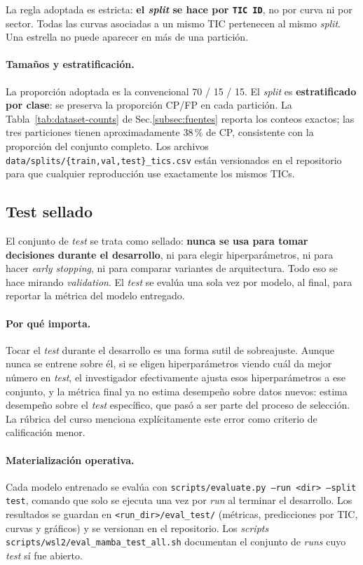 \documentclass[11pt,a4paper]{article}
\begin{document}
La regla adoptada es estricta: \textbf{el \textit{split} se hace por
\texttt{TIC ID}}, no por curva ni por sector. Todas las curvas
asociadas a un mismo TIC pertenecen al mismo \textit{split}. Una
estrella no puede aparecer en más de una partición.

\paragraph{Tamaños y estratificación.}
La proporción adoptada es la convencional 70 / 15 / 15. El \textit{split}
es \textbf{estratificado por clase}: se preserva la proporción CP/FP en
cada partición. La Tabla~\ref{tab:dataset-counts} de
Sec.\ref{subsec:fuentes} reporta los conteos exactos; las tres
particiones tienen aproximadamente 38\,\% de CP, consistente con la
proporción del conjunto completo. Los archivos
\texttt{data/splits/\{train,val,test\}\_tics.csv} están versionados en
el repositorio para que cualquier reproducción use exactamente los
mismos TICs.

\subsection{Test sellado}
\label{subsec:test-sellado}

El conjunto de \textit{test} se trata como sellado: \textbf{nunca se
usa para tomar decisiones durante el desarrollo}, ni para elegir
hiperparámetros, ni para hacer \textit{early stopping}, ni para
comparar variantes de arquitectura. Todo eso se hace mirando
\textit{validation}. El \textit{test} se evalúa una sola vez por
modelo, al final, para reportar la métrica del modelo entregado.

\paragraph{Por qué importa.}
Tocar el \textit{test} durante el desarrollo es una forma sutil de
sobreajuste. Aunque nunca se entrene sobre él, si se eligen
hiperparámetros viendo cuál da mejor número en \textit{test}, el
investigador efectivamente ajusta esos hiperparámetros a ese
conjunto, y la métrica final ya no estima desempeño sobre datos
nuevos: estima desempeño sobre el \textit{test} específico, que pasó
a ser parte del proceso de selección. La rúbrica del curso menciona
explícitamente este error como criterio de calificación menor.

\paragraph{Materialización operativa.}
Cada modelo entrenado se evalúa con \texttt{scripts/evaluate.py
--run <dir> --split test}, comando que solo se ejecuta una vez por
\textit{run} al terminar el desarrollo. Los resultados se guardan en
\texttt{<run\_dir>/eval\_test/} (métricas, predicciones por TIC,
curvas y gráficos) y se versionan en el repositorio. Los
\textit{scripts} \texttt{scripts/wsl2/eval\_mamba\_test\_all.sh}
documentan el conjunto de \textit{runs} cuyo \textit{test} sí fue
abierto.
\end{document}
